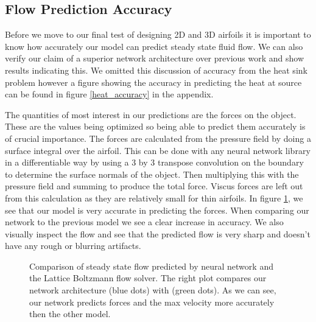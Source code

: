 \documentclass{article} %
\begin{document}
\begin{figure}[h]
\begin{center}
\end{center}
\end{figure}


\subsection{Flow Prediction Accuracy}

Before we move to our final test of designing 2D and 3D airfoils it is important to know how accurately our model can predict steady state fluid flow. We can also verify our claim of a superior network architecture over previous work and show results indicating this. We omitted this discussion of accuracy from the heat sink problem however a figure showing the accuracy in predicting the heat at source can be found in figure \ref{heat_accuracy} in the appendix.

The quantities of most interest in our predictions are the forces on the object. These are the values being optimized so being able to predict them accurately is of crucial importance. The forces are calculated from the pressure field by doing a surface integral over the airfoil. This can be done with any neural network library in a differentiable way by using a 3 by 3 transpose convolution on the boundary to determine the surface normals of the object. Then multiplying this with the pressure field and summing to produce the total force. Viscus forces are left out from this calculation as they are relatively small for thin airfoils. In figure \ref{flow_accuracy}, we see that our model is very accurate in predicting the forces. When comparing our network to the previous model we see a clear increase in accuracy. We also visually inspect the flow and see that the predicted flow is very sharp and doesn't have any rough or blurring artifacts.

\begin{figure}[h]
\begin{center}
\end{center}
\caption{Comparison of steady state flow predicted by neural network and the Lattice Boltzmann flow solver. The right plot compares our network architecture (blue dots) with \citet{guo2016convolutional} (green dots). As we can see, our network predicts forces and the max velocity more accurately then the other model. }
\label{flow_accuracy}
\end{figure}
\end{document}
